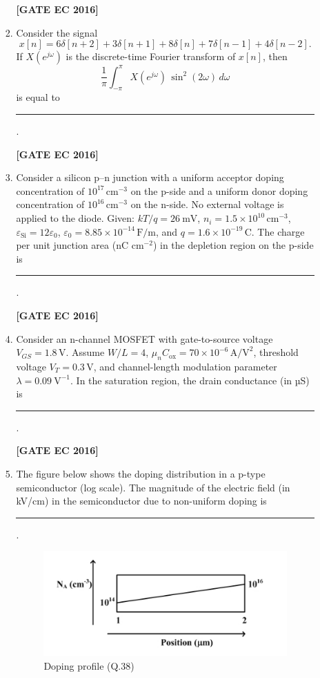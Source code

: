 \documentclass[12pt]{article}
\begin{document}
\begin{enumerate}[label=\textbf{Q.\arabic*.}, start=6, itemsep=2em]
\begin{enumerate}[label=\textbf{Q.\arabic*.}, start=26]
\begin{enumerate}[label=\textbf{Q.\arabic*.}, start=31]
\noindent \textbf{[GATE EC 2016]}

\item Consider the signal
\[
x[n]=6\delta[n+2]+3\delta[n+1]+8\delta[n]+7\delta[n-1]+4\delta[n-2].
\]
If $X(e^{j\omega})$ is the discrete-time Fourier transform of $x[n]$, then
\[
\frac{1}{\pi}\int_{-\pi}^{\pi} X(e^{j\omega})\,\sin^2(2\omega)\,d\omega
\]
is equal to \rule{3cm}{0.4pt}.

\noindent \textbf{[GATE EC 2016]}

\item Consider a silicon p–n junction with a uniform acceptor doping concentration of $10^{17}\,\text{cm}^{-3}$ on the p-side and a uniform donor doping concentration of $10^{16}\,\text{cm}^{-3}$ on the n-side. No external voltage is applied to the diode. Given: $kT/q=26\ \text{mV}$, $n_i=1.5\times10^{10}\,\text{cm}^{-3}$, $\varepsilon_{\text{Si}}=12\varepsilon_0$, $\varepsilon_0=8.85\times10^{-14}\,\text{F/m}$, and $q=1.6\times10^{-19}\,$C. The charge per unit junction area (nC cm$^{-2}$) in the depletion region on the p-side is \rule{3cm}{0.4pt}.

\noindent \textbf{[GATE EC 2016]}

\item Consider an n-channel MOSFET with gate-to-source voltage $V_{GS}=1.8\,$V. Assume $W/L=4$, $\mu_n C_{\text{ox}} = 70\times10^{-6}\,\text{A/V}^2$, threshold voltage $V_T=0.3\,$V, and channel-length modulation parameter $\lambda=0.09\ \text{V}^{-1}$. In the saturation region, the drain conductance (in µS) is \rule{3cm}{0.4pt}.

\noindent \textbf{[GATE EC 2016]}

\item The figure below shows the doping distribution in a p-type semiconductor (log scale). The magnitude of the electric field (in kV/cm) in the semiconductor due to non-uniform doping is \rule{3cm}{0.4pt}.

\begin{figure}[H]\centering
    \includegraphics[width=0.6\columnwidth]{figs/q38.png}
    \caption{Doping profile (Q.38)}
    \label{fig:q38}
\end{figure}


\end{enumerate}
\end{enumerate}
\end{enumerate}
\end{document}
